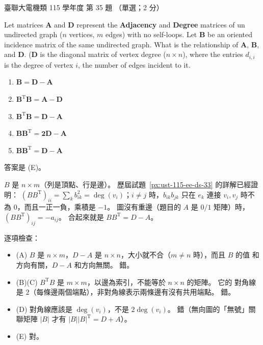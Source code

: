 \begin{pastexam}[label={px:ust-115-ee-ds-35}]{臺聯大電機類 115 學年度 第 35 題}
（單選；2 分）

Let matrices \textbf{A} and \textbf{D} represent the \textbf{Adjacency} and \textbf{Degree} matrices
of un undirected graph ($n$ vertices, $m$ edges) with no self-loops. Let \textbf{B} be an oriented
incidence matrix of the same undirected graph. What is the relationship of \textbf{A}, \textbf{B},
and \textbf{D}. (\textbf{D} is the diagonal matrix of vertex degree ($n\times n$), where the entries
$d_{i,i}$ is the degree of vertex $i$, the number of edges incident to it.
\begin{enumerate}[label=(\Alph*)]
\item $\mathbf{B}=\mathbf{D}-\mathbf{A}$
\item $\mathbf{B}^{\mathrm{T}}\mathbf{B}=\mathbf{A}-\mathbf{D}$
\item $\mathbf{B}^{\mathrm{T}}\mathbf{B}=\mathbf{D}-\mathbf{A}$
\item $\mathbf{B}\mathbf{B}^{\mathrm{T}}=\mathbf{2D}-\mathbf{A}$
\item $\mathbf{B}\mathbf{B}^{\mathrm{T}}=\mathbf{D}-\mathbf{A}$
\end{enumerate}
\end{pastexam}

\begin{pastsoln}
答案是 (E)。

$B$ 是 $n \times m$（列是頂點、行是邊）。 歷屆試題~\ref{px:ust-115-ee-ds-33} 的詳解已經證明：
$(BB^{\mathrm T})_{ii} = \sum_k b_{ik}^2 = \deg(v_i)$；$i \ne j$ 時，$b_{ik} b_{jk}$ 只在 $e_k$
連接 $v_i, v_j$ 時不為 $0$，而且一正一負，乘積是 $-1$。 圖沒有重邊（題目的 $A$ 是 $0/1$ 矩陣）時，
$(BB^{\mathrm T})_{ij} = -a_{ij}$。 合起來就是 $BB^{\mathrm T} = D - A$。

逐項檢查：
\begin{itemize}
\item (A) $B$ 是 $n \times m$，$D - A$ 是 $n \times n$，大小就不合（$m \ne n$ 時），而且 $B$ 的值
和方向有關，$D - A$ 和方向無關。 錯。
\item (B)(C) $B^{\mathrm T}B$ 是 $m \times m$，以邊為索引，不能等於 $n \times n$ 的矩陣。 它的
對角線是 $2$（每條邊兩個端點），非對角線表示兩條邊有沒有共用端點。 錯。
\item (D) 對角線應該是 $\deg(v_i)$，不是 $2\deg(v_i)$。 錯（無向圖的「無號」關聯矩陣
$|B|$ 才有 $|B||B|^{\mathrm T} = D + A$）。
\item (E) 對。
\end{itemize}
\end{pastsoln}

